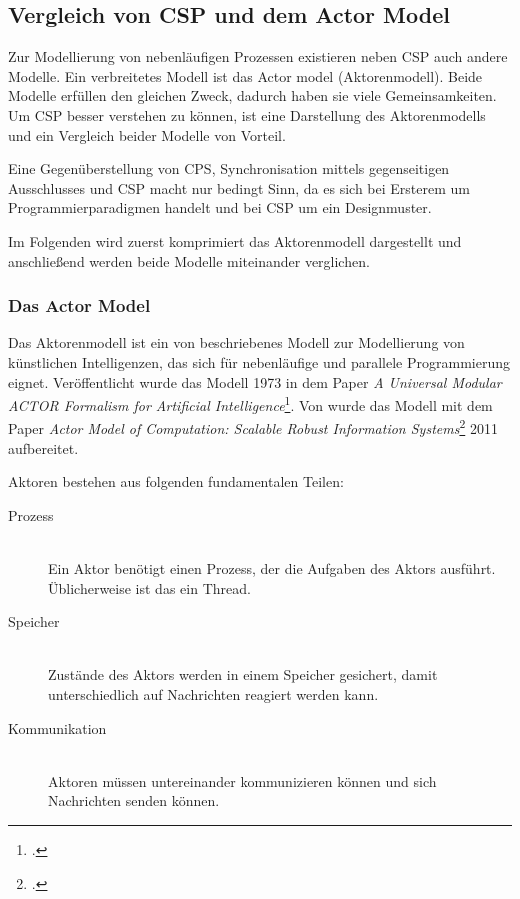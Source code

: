 \documentclass[12pt,a4paper,parskip=half,listof=totoc]{scrreprt}
\begin{document}
\subsection{Vergleich von \acs{CSP} und dem Actor Model}

Zur Modellierung von nebenläufigen Prozessen existieren neben \ac{CSP} auch andere Modelle. Ein verbreitetes Modell ist das Actor model (Aktorenmodell). Beide Modelle erfüllen den gleichen Zweck, dadurch haben sie viele Gemeinsamkeiten. Um \ac{CSP} besser verstehen zu können, ist eine Darstellung des Aktorenmodells und ein Vergleich beider Modelle von Vorteil.

Eine Gegenüberstellung von \ac{CPS}, Synchronisation mittels gegenseitigen Ausschlusses und \ac{CSP} macht nur bedingt Sinn, da es sich bei Ersterem um Programmierparadigmen handelt und bei \ac{CSP} um ein Designmuster.

Im Folgenden wird zuerst komprimiert das Aktorenmodell dargestellt und anschließend werden beide Modelle miteinander verglichen.

\subsubsection{Das Actor Model}
Das Aktorenmodell ist ein von \citeauthor{ACTORS} beschriebenes Modell zur Modellierung von künstlichen Intelligenzen, das sich für nebenläufige und parallele Programmierung eignet. Veröffentlicht wurde das Modell 1973 in dem Paper \textit{A Universal Modular ACTOR Formalism for Artificial Intelligence}\footcite{ACTORS}. Von \citeauthor{ACTORSNEW} wurde das Modell mit dem Paper \textit{Actor Model of Computation: Scalable Robust Information Systems}\footcite{ACTORSNEW} 2011 aufbereitet. 

Aktoren bestehen aus folgenden fundamentalen Teilen:

\begin{description}
\item[Prozess]\hfill \\
Ein Aktor benötigt einen Prozess, der die Aufgaben des Aktors ausführt. Üblicherweise ist das ein Thread.
\item[Speicher]\hfill \\
Zustände des Aktors werden in einem Speicher gesichert, damit unterschiedlich auf Nachrichten reagiert werden kann.
\item[Kommunikation] \hfill \\
Aktoren müssen untereinander kommunizieren können und sich Nachrichten senden können.
\end{description}
\end{document}
